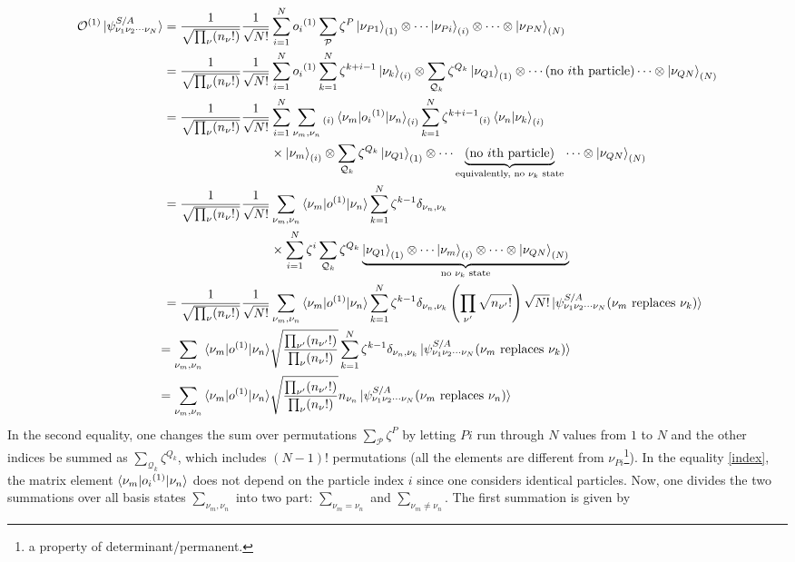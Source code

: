 \documentclass[a4paper,12pts]{article}
\numberwithin{equation}{section}
\begin{document}
	\begin{align}
	\mathcal{O}^{(1)}\ket{\psi_{\nu_1\nu_2\cdots\nu_N}^{S/A}} = \frac{1}{\sqrt{\prod_{\nu}(n_{\nu}!)}}\frac{1}{\sqrt{N!}}&\sum_{i=1}^N{o_i}^{(1)}\sum_{\mathcal{P}}\zeta^{P}\ket{\nu_{P1}}_{(1)}\otimes\cdots\ket{\nu_{Pi}}_{(i)}\otimes\cdots\otimes\ket{\nu_{PN}}_{(N)}\\
	= \frac{1}{\sqrt{\prod_{\nu}(n_{\nu}!)}}\frac{1}{\sqrt{N!}}&\sum_{i=1}^N{o_i}^{(1)}\sum_{k=1}^N\zeta^{k+i-1}\ket{\nu_k}_{(i)}\otimes\sum_{\mathcal{Q}_k}\zeta^{Q_k}\ket{\nu_{Q1}}_{(1)}\otimes\cdots(\text{no $i$th particle})\cdots\otimes\ket{\nu_{QN}}_{(N)}\\
	= \frac{1}{\sqrt{\prod_{\nu}(n_{\nu}!)}}\frac{1}{\sqrt{N!}}&\sum_{i=1}^N\sum_{\nu_m,\nu_n}{}_{(i)}\braket{\nu_m|{o_i}^{(1)}|\nu_n}_{(i)}\sum_{k=1}^N\zeta^{k+i-1}{}_{(i)}\braket{\nu_n|\nu_k}_{(i)}\nonumber\\
	&\times\ket{\nu_m}_{(i)}\otimes\sum_{\mathcal{Q}_k}\zeta^{Q_k}\ket{\nu_{Q1}}_{(1)}\otimes\cdots\underbrace{(\text{no $i$th particle})}_{\text{equivalently, no $\nu_k$ state}}\cdots\otimes\ket{\nu_{QN}}_{(N)}\\
	= \frac{1}{\sqrt{\prod_{\nu}(n_{\nu}!)}}\frac{1}{\sqrt{N!}}&\sum_{\nu_m,\nu_n}\braket{\nu_m|o^{(1)}|\nu_n}\sum_{k=1}^N\zeta^{k-1}\delta_{\nu_n,\nu_k}\nonumber\\
	&\times\sum_{i=1}^N\zeta^i\sum_{\mathcal{Q}_k}\zeta^{Q_k}\underbrace{\ket{\nu_{Q1}}_{(1)}\otimes\cdots\ket{\nu_m}_{(i)}\otimes\cdots\otimes\ket{\nu_{QN}}_{(N)}}_{\text{no $\nu_k$ state}} \label{index}\\
	= \frac{1}{\sqrt{\prod_{\nu}(n_{\nu}!)}}\frac{1}{\sqrt{N!}}&\sum_{\nu_m,\nu_n}\braket{\nu_m|o^{(1)}|\nu_n}\sum_{k=1}^N\zeta^{k-1}\delta_{\nu_n,\nu_k}\left(\prod_{\nu'}\sqrt{n_{\nu'}!}\right)\sqrt{N!}\ket{\psi_{\nu_1\nu_2\cdots\nu_N}^{S/A}(\nu_m\text{ replaces }\nu_k)}\\
	= \sum_{\nu_m,\nu_n}\braket{\nu_m|o^{(1)}|\nu_n}&\sqrt{\frac{\prod_{\nu'}(n_{\nu'}!)}{\prod_{\nu}(n_{\nu}!)}}\sum_{k=1}^N\zeta^{k-1}\delta_{\nu_n,\nu_k}\ket{\psi_{\nu_1\nu_2\cdots\nu_N}^{S/A}(\nu_m\text{ replaces }\nu_k)}\\
	= \sum_{\nu_m,\nu_n}\braket{\nu_m|o^{(1)}|\nu_n}&\sqrt{\frac{\prod_{\nu'}(n_{\nu'}!)}{\prod_{\nu}(n_{\nu}!)}}n_{\nu_n}\ket{\psi_{\nu_1\nu_2\cdots\nu_N}^{S/A}(\nu_m\text{ replaces }\nu_n)}
	\end{align}
	In the second equality, one changes the sum over permutations $\sum_{\mathcal{P}}\zeta^{P}$ by letting $Pi$ run through $N$ values from $1$ to $N$ and the other indices be summed as $\sum_{\mathcal{Q}_k}\zeta^{Q_k}$, which includes $(N-1)!$ permutations (all the elements are different from $\nu_{Pi}$\footnote{a property of determinant/permanent.}). In the equality \ref{index}, the matrix element $\braket{\nu_m|{o_i}^{(1)}|\nu_n}$ does not depend on the particle index $i$ since one considers identical particles. Now, one divides the two summations over all basis states $\displaystyle\sum_{\nu_m,\nu_n}$ into two part: $\displaystyle\sum_{\nu_m=\nu_n}$ and $\displaystyle\sum_{\nu_m\neq\nu_n}$. The first summation is given by
\end{document}
